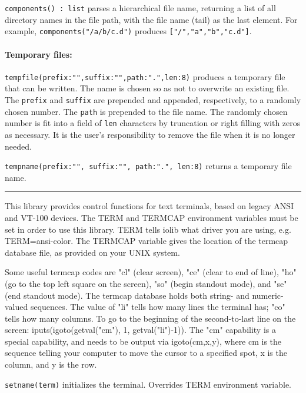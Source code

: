 \texttt{components() : list} parses a hierarchical file name, returning
a list of all directory names in the file path, with the file name
(tail) as the last element. For example,
\texttt{components("/a/b/c.d")} produces
\texttt{["/","a","b","c.d"]}.

\paragraph{Temporary files:}
\texttt{tempfile(prefix:"",suffix:"",path:".",len:8)}
produces a temporary file that can be written. The name is chosen so as
not to overwrite an existing file. The \texttt{prefix} and
\texttt{suffix} are prepended and appended, respectively, to a randomly
chosen number. The \texttt{path} is prepended to the file name. The
randomly chosen number is fit into a field of \texttt{len} characters
by truncation or right filling with zeros as necessary. It is the
user's responsibility to remove the file when it is no
longer needed.

\texttt{tempname(prefix:"",
suffix:"",
path:".", len:8)} returns a
temporary file name.

\vspace{0.25cm}\hrule{}

This library provides control functions for text terminals, based on
legacy ANSI and VT-100 devices. The TERM and TERMCAP environment variables must be set in order to use
this library. TERM tells iolib what driver you are using,
e.g. TERM=ansi-color. The TERMCAP variable
gives the location of the termcap database file, as provided on your
UNIX system.

Some useful termcap codes are "cl" (clear
screen), "ce" (clear to end of line),
"ho" (go to the top left square on the
screen), "so" (begin standout mode), and
"se" (end standout mode). The termcap
database holds both string- and numeric-valued sequences. The value
of "li" tells how many
lines the terminal has; "co" tells how
many columns. To go to the beginning of the second-to-last line on the
screen: iputs(igoto(getval("cm"), 1,
getval("li")-1)). The
"cm" capability is a special capability,
and needs to be output via igoto(cm,x,y), where cm is the sequence
telling your computer to move the cursor to a specified spot, x is the
column, and y is the row.

\texttt{setname(term)} initializes the terminal. Overrides
TERM environment variable.

